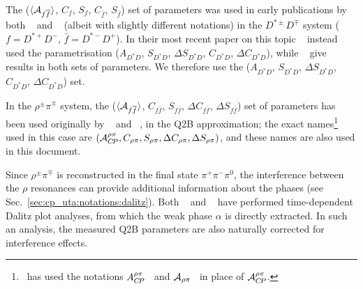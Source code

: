 The ($\Adirnoncp$, $C_f$, $S_f$, $C_{\bar{f}}$, $S_{\bar{f}}$)
set of parameters was used in early publications by both \babar~\cite{Aubert:2007pa} and \belle~\cite{Aushev:2004uc} (albeit with slightly different notations) in the $D^{*\pm}D^{\mp}$ system ($f = D^{*+}D^-$, $\bar{f} = D^{*-}D^+$).
In their most recent paper on this topic \belle~\cite{Rohrken:2012ta} instead used the parametrisation ($A_{D^*D}$, $S_{D^*D}$, $\Delta S_{D^*D}$, $C_{D^*D}$, $\Delta C_{D^*D}$), while \babar~\cite{Aubert:2008ah} give results in both sets of parameters.
We therefore use the ($A_{D^*D}$, $S_{D^*D}$, $\Delta S_{D^*D}$, $C_{D^*D}$, $\Delta C_{D^*D}$) set.

\mysubsubsubsection{$\Bz \to \rho^{\pm}\pi^\mp$
}
\label{sec:cp_uta:notations:non_cp:rhopi}

In the $\rho^\pm\pi^\mp$ system, the 
($\Adirnoncp$, $C_{f\bar{f}}$, $S_{f\bar{f}}$, $\Delta C_{f\bar{f}}$, 
$\Delta S_{f\bar{f}}$)
set of parameters has been used 
originally by \babar~\cite{Aubert:2003wr} and \belle~\cite{Wang:2004va}, 
in the Q2B approximation; 
the exact names\footnote{
  \babar\ has used the notations
  $A_{C\!P}^{\rho\pi}$~\cite{Aubert:2003wr} and 
  ${\cal A}_{\rho\pi}$~\cite{Aubert:2007jn}
  in place of ${\cal A}_{C\!P}^{\rho\pi}$.
}
used in this case are
$\left( 
  {\cal A}_{C\!P}^{\rho\pi}, C_{\rho\pi}, S_{\rho\pi}, \Delta C_{\rho\pi}, \Delta S_{\rho\pi}
\right)$,
and these names are also used in this document.

Since $\rho^\pm\pi^\mp$ is reconstructed in the final state $\pi^+\pi^-\pi^0$,
the interference between the $\rho$ resonances
can provide additional information about the phases 
(see Sec.~\ref{sec:cp_uta:notations:dalitz}).
Both \babar~\cite{Aubert:2007jn} 
and \belle~\cite{Kusaka:2007dv,:2007mj}
have performed time-dependent Dalitz plot analyses, 
from which the weak phase $\alpha$ is directly extracted.
In such an analysis, the measured Q2B parameters are 
also naturally corrected for interference effects.

\label{sec:cp_uta:notations:non_cp:dstarpi}

